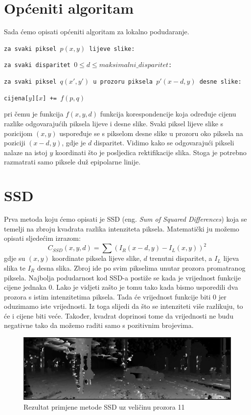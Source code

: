 \documentclass[utf8, zavrsni, numeric]{fer}
\begin{document}
\section{Općeniti algoritam}
Sada ćemo opisati općeniti algoritam za lokalno podudaranje.

{\tt za svaki piksel $p(x, y)$ lijeve slike:}

{\quad \tt za svaki disparitet $0 \leq d \leq maksimalni\_ disparitet$:}

{\quad\quad\tt za svaki piksel $q(x', y')$ u prozoru piksela $p'(x - d, y)$ desne slike:}

{\quad\quad\quad \tt cijena[$y$][$x$] += $f(p, q)$}    


\noindent pri čemu je funkcija $f(x, y, d)$ funkcija korespondencije koja određuje cijenu razlike odgovarajućih piksela lijeve i desne slike. Svaki piksel lijeve slike s pozicijom $(x, y)$
uspoređuje se s pikselom desne slike u prozoru oko piksela na poziciji $(x - d, y)$, gdje je $d$ disparitet. Vidimo kako se odgovarajući pikseli nalaze na istoj $y$ koordinati što je posljedica rektifikacije slika.
Stoga je potrebno razmatrati samo piksele duž epipolarne linije.

\section{SSD}

Prva metoda koju ćemo opisati je SSD ({eng. \sl Sum of Squared Differences}) koja se temelji na zbroju kvadrata razlika intenziteta piksela.
Matematički ju možemo opisati sljedećim izrazom:
\[
C_{SSD}(x, y, d) = \sum(I_R(x - d, y) - I_L(x, y))^2
\]
gdje su $(x, y)$ koordinate piksela lijeve slike, $d$ trenutni disparitet, a $I_L$ lijeva slika te $I_R$ desna slika. Zbroj ide po svim pikselima unutar prozora promatranog piksela.
Najbolja podudarnost kod SSD-a postiže se kada je vrijednost funkcije cijene jednaka $0$. Lako je vidjeti zašto je tomu tako kada bismo usporedili dva prozora s istim intenzitetima piksela. Tada će vrijednost funkcije biti $0$ jer oduzimamo iste vrijednosti. Iz toga slijedi da što se intenziteti više razlikuju, to će i cijene biti veće. Također, kvadrat doprinosi tome da vrijednosti ne budu negativne tako da možemo raditi samo s pozitivnim brojevima.

\begin{figure}[htb]
  \centering
  \includegraphics[width=14cm]{img/local_000046_10_SSD_11_140_scaled.png}
  \caption{Rezultat primjene metode SSD uz veličinu prozora 11}
  \label{fig:SSD-KITTI}
\end{figure}
\end{document}
